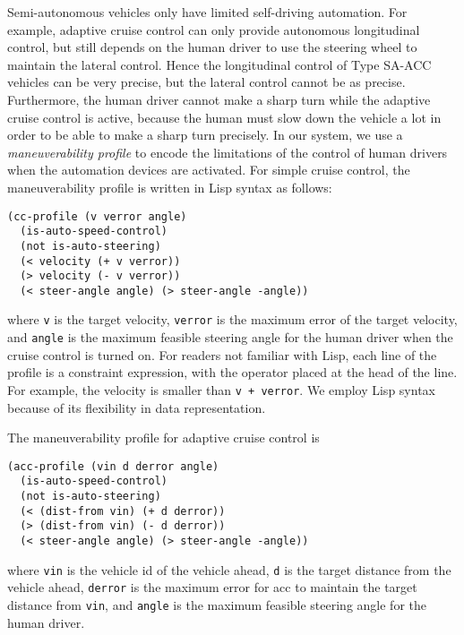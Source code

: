 Semi-autonomous vehicles only have limited self-driving automation.
For example, adaptive cruise control can only provide autonomous
longitudinal control, but still depends on the human driver to use the
steering wheel to maintain the lateral control.  Hence the
longitudinal control of Type SA-ACC vehicles can be very precise, but
the lateral control cannot be as precise.  Furthermore, the human
driver cannot make a sharp turn while the adaptive cruise control is
active, because the human must slow down the vehicle a lot in order to
be able to make a sharp turn precisely.  In our system, we use a
\emph{maneuverability profile} to encode the limitations of the
control of human drivers when the automation devices are activated.
For simple cruise control, the maneuverability profile is written in
Lisp syntax as follows:
\begin{small}
\begin{verbatim}
(cc-profile (v verror angle)
  (is-auto-speed-control)
  (not is-auto-steering)
  (< velocity (+ v verror))
  (> velocity (- v verror))
  (< steer-angle angle) (> steer-angle -angle))
\end{verbatim}
\end{small}
\noindent
where \texttt{v} is the target velocity, \texttt{verror} is the
maximum error of the target velocity, and \texttt{angle} is the
maximum feasible steering angle for the human driver when the cruise
control is turned on. For readers not familiar with Lisp, each line of
the profile is a constraint expression, with the operator placed at
the head of the line. For example, the velocity is smaller than
\texttt{v + verror}. We employ Lisp syntax because of its flexibility
in data representation.

The maneuverability profile for adaptive cruise
control is
\begin{small}
\begin{verbatim}
(acc-profile (vin d derror angle)
  (is-auto-speed-control)
  (not is-auto-steering)
  (< (dist-from vin) (+ d derror))
  (> (dist-from vin) (- d derror))
  (< steer-angle angle) (> steer-angle -angle))
\end{verbatim}
\end{small}
\noindent
where \texttt{vin} is the vehicle id of the vehicle ahead,
\texttt{d} is the target distance from the vehicle ahead, \texttt{derror}
is the maximum error for acc to maintain the target distance from
\texttt{vin}, and \texttt{angle} is the maximum feasible steering
angle for the human driver.

